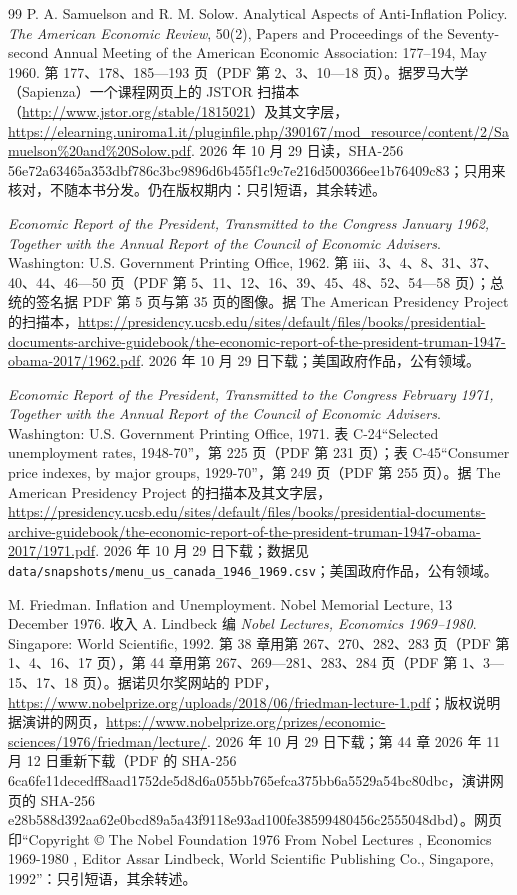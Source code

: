 \begin{thebibliography}{99}
 P. A. Samuelson and R. M. Solow. Analytical Aspects of Anti-Inflation Policy. \emph{The American Economic Review}, 50(2), Papers and Proceedings of the Seventy-second Annual Meeting of the American Economic Association: 177--194, May 1960. 第 177、178、185—193 页（PDF 第 2、3、10—18 页）。据罗马大学（Sapienza）一个课程网页上的 JSTOR 扫描本（\url{http://www.jstor.org/stable/1815021}）及其文字层，\url{https://elearning.uniroma1.it/pluginfile.php/390167/mod_resource/content/2/Samuelson\%20and\%20Solow.pdf}. 2026 年 10 月 29 日读，SHA-256 56e72a63465a353dbf786c3bc9896d6b455f1c9c7e216d500366ee1b76409c83；只用来核对，不随本书分发。仍在版权期内：只引短语，其余转述。

 \emph{Economic Report of the President, Transmitted to the Congress January 1962, Together with the Annual Report of the Council of Economic Advisers}. Washington: U.S. Government Printing Office, 1962. 第 iii、3、4、8、31、37、40、44、46—50 页（PDF 第 5、11、12、16、39、45、48、52、54—58 页）；总统的签名据 PDF 第 5 页与第 35 页的图像。据 The American Presidency Project 的扫描本，\url{https://presidency.ucsb.edu/sites/default/files/books/presidential-documents-archive-guidebook/the-economic-report-of-the-president-truman-1947-obama-2017/1962.pdf}. 2026 年 10 月 29 日下载；美国政府作品，公有领域。

 \emph{Economic Report of the President, Transmitted to the Congress February 1971, Together with the Annual Report of the Council of Economic Advisers}. Washington: U.S. Government Printing Office, 1971. 表 C-24“Selected unemployment rates, 1948-70”，第 225 页（PDF 第 231 页）；表 C-45“Consumer price indexes, by major groups, 1929-70”，第 249 页（PDF 第 255 页）。据 The American Presidency Project 的扫描本及其文字层，\url{https://presidency.ucsb.edu/sites/default/files/books/presidential-documents-archive-guidebook/the-economic-report-of-the-president-truman-1947-obama-2017/1971.pdf}. 2026 年 10 月 29 日下载；数据见 \texttt{data/snapshots/menu\_us\_canada\_1946\_1969.csv}；美国政府作品，公有领域。

 M. Friedman. Inflation and Unemployment. Nobel Memorial Lecture, 13 December 1976. 收入 A. Lindbeck 编 \emph{Nobel Lectures, Economics 1969--1980}. Singapore: World Scientific, 1992. 第 38 章用第 267、270、282、283 页（PDF 第 1、4、16、17 页），第 44 章用第 267、269—281、283、284 页（PDF 第 1、3—15、17、18 页）。据诺贝尔奖网站的 PDF，\url{https://www.nobelprize.org/uploads/2018/06/friedman-lecture-1.pdf}；版权说明据演讲的网页，\url{https://www.nobelprize.org/prizes/economic-sciences/1976/friedman/lecture/}. 2026 年 10 月 29 日下载；第 44 章 2026 年 11 月 12 日重新下载（PDF 的 SHA-256 6ca6fe11decedff8aad1752de5d8d6a055bb765efca375bb6a5529a54bc80dbc，演讲网页的 SHA-256 e28b588d392aa62e0bcd89a5a43f9118e93ad100fe38599480456c2555048dbd）。网页印“Copyright © The Nobel Foundation 1976 From Nobel Lectures , Economics 1969-1980 , Editor Assar Lindbeck, World Scientific Publishing Co., Singapore, 1992”：只引短语，其余转述。


\end{thebibliography}
